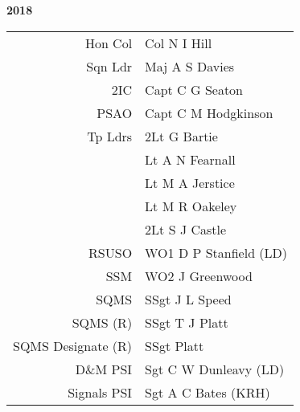 
\begin{center}
  \Huge
  \textbf{2018}
\end{center}

\begin{center}
  \small
  \begin{tabular}{rl}
    Hon Col & Col N I Hill \\
    Sqn Ldr & Maj A S Davies \\
    2IC & Capt C G Seaton \\
    PSAO & Capt C M Hodgkinson \\
    Tp Ldrs & 2Lt G Bartie \\
     & Lt A N Fearnall \\
     & Lt M A Jerstice \\
     & Lt M R Oakeley \\
     & 2Lt S J Castle \\
    RSUSO & WO1 D P Stanfield (LD) \\
    SSM & WO2 J Greenwood \\
    SQMS & SSgt J L Speed \\
    SQMS (R) & SSgt T J Platt \\
    SQMS Designate (R) & SSgt Platt \\
    D\&M PSI & Sgt C W Dunleavy (LD) \\
    Signals PSI & Sgt A C Bates (KRH) \\
  \end{tabular}
\end{center}


